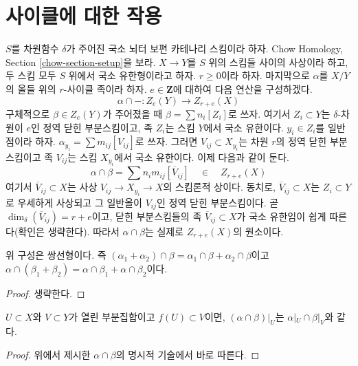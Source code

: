 \section{사이클에 대한 작용}
\label{section-action}

\noindent
$S$를 차원함수 $\delta$가 주어진 국소 뇌터 보편 카테나리 스킴이라
하자. Chow Homology, Section \ref{chow-section-setup}을 보라. $X \to Y$를
$S$ 위의 스킴들 사이의 사상이라 하고, 두 스킴 모두 $S$ 위에서 국소
유한형이라고 하자. $r \geq 0$이라 하자. 마지막으로 $\alpha$를 $X/Y$의
올들 위의 $r$-사이클 족이라 하자. $e \in \mathbf{Z}$에 대하여 다음
연산을 구성하겠다.
$$
\alpha \cap - : Z_e(Y) \longrightarrow Z_{r + e}(X)
$$
구체적으로 $\beta \in Z_e(Y)$가 주어졌을 때
$\beta = \sum n_i[Z_i]$로 쓰자. 여기서 $Z_i \subset Y$는
$\delta$-차원이 $e$인 정역 닫힌 부분스킴이고, 족 $Z_i$는 스킴
$Y$에서 국소 유한이다. $y_i \in Z_i$를 일반점이라 하자.
$\alpha_{y_i} = \sum m_{ij} [V_{ij}]$로 쓰자. 그러면
$V_{ij} \subset X_{y_i}$는 차원 $r$의 정역 닫힌 부분스킴이고 족
$V_{ij}$는 스킴 $X_{y_i}$에서 국소 유한이다. 이제 다음과 같이 둔다.
$$
\alpha \cap \beta = \sum n_i m_{ij} [\overline{V}_{ij}]
\quad\in\quad
Z_{r + e}(X)
$$
여기서 $\overline{V}_{ij} \subset X$는 사상
$V_{ij} \to X_{y_i} \to X$의 스킴론적 상이다. 동치로,
$\overline{V}_{ij} \subset X$는 $Z_i \subset Y$로 우세하게 사상되고
그 일반올이 $V_{ij}$인 정역 닫힌 부분스킴이다. 곧
$\dim_\delta(\overline{V}_{ij}) = r + e$이고, 닫힌 부분스킴들의 족
$\overline{V}_{ij} \subset X$가 국소 유한임이 쉽게 따른다(확인은
생략한다). 따라서 $\alpha \cap \beta$는 실제로 $Z_{r + e}(X)$의
원소이다.

\begin{lemma}
\label{lemma-action-bilinear}
위 구성은 쌍선형이다. 즉
$(\alpha_1 + \alpha_2) \cap \beta = \alpha_1 \cap \beta +
\alpha_2 \cap \beta$이고 $\alpha \cap (\beta_1 + \beta_2) =
\alpha \cap \beta_1 + \alpha \cap \beta_2$이다.
\end{lemma}

\begin{proof}
생략한다.
\end{proof}

\begin{lemma}
\label{lemma-action-opens}
$U \subset X$와 $V \subset Y$가 열린 부분집합이고 $f(U) \subset V$이면,
$(\alpha \cap \beta)|_U$는 $\alpha|_U \cap \beta|_V$와 같다.
\end{lemma}

\begin{proof}
위에서 제시한 $\alpha \cap \beta$의 명시적 기술에서 바로 따른다.
\end{proof}

